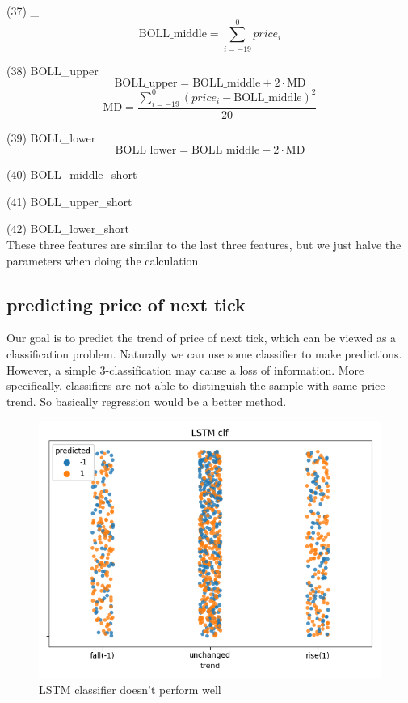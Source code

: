 \documentclass[10pt, conference, compsocconf]{IEEEtran}
\begin{document}
\begin{enumerate}
	(37) \_\\
	$$
		\text{BOLL}\_\text{middle} = \sum_{i=-19}^{0}price_i
	$$

	(38) BOLL\_upper\\
	$$
		\text{BOLL}\_\text{upper} = \text{BOLL}\_\text{middle} + 2 \cdot \text{MD}
	$$
	$$
		\text{MD} = \frac{\sum_{i=-19}^{0}(price_i - \text{BOLL}\_\text{middle})^2}{20}
	$$

	(39) BOLL\_lower\\
	$$
		\text{BOLL}\_\text{lower} = \text{BOLL}\_\text{middle} - 2 \cdot \text{MD}
	$$

	(40) BOLL\_middle\_short

	(41) BOLL\_upper\_short

	(42) BOLL\_lower\_short\\
	These three features are similar to the last three features, but we just halve the parameters when doing the calculation.




\end{enumerate}
\subsection{predicting price of next tick}
Our goal is to predict the trend of price of next tick, which can be viewed as a classification problem. Naturally we can use some classifier to make predictions. However, a simple 3-classification may cause a loss of information. More 
specifically, classifiers are not able to distinguish the sample with same price trend. So basically regression would be a better method. \\

\begin{figure}[ht]
	\centering
	\includegraphics[scale=0.3]{cl_lstm_npd.png}
	\caption{LSTM classifier doesn't perform well} \label{fig 4}
\end{figure}
\end{document}
